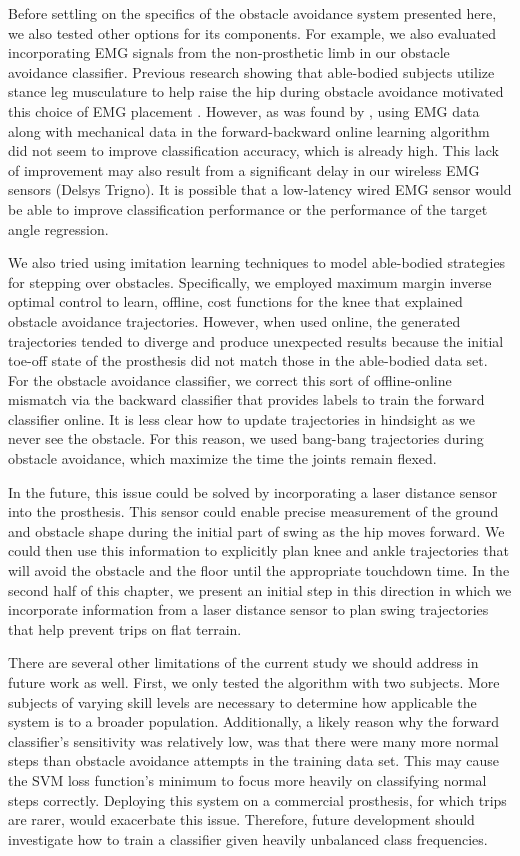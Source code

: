 Before settling on the specifics of the obstacle avoidance system presented
here, we also tested other options for its components. For example, we also
evaluated incorporating EMG signals from the non-prosthetic limb in our obstacle
avoidance classifier. Previous research showing that able-bodied subjects
utilize stance leg musculature to help raise the hip during obstacle avoidance
motivated this choice of EMG placement \citep{patla1995role}. However, as was
found by \citet{spanias2018online}, using EMG data along with mechanical data in
the forward-backward online learning algorithm did not seem to improve
classification accuracy, which is already high. This lack of improvement may
also result from a significant delay in our wireless EMG sensors (Delsys
Trigno). It is possible that a low-latency wired EMG sensor would be able to
improve classification performance or the performance of the target angle
regression.

We also tried using imitation learning techniques to model able-bodied
strategies for stepping over obstacles. Specifically, we employed maximum margin
inverse optimal control \citep{ratliff2007online} to learn, offline, cost
functions for the knee that explained obstacle avoidance trajectories. However,
when used online, the generated trajectories tended to diverge and produce
unexpected results because the initial toe-off state of the prosthesis did not
match those in the able-bodied data set. For the obstacle avoidance classifier,
we correct this sort of offline-online mismatch via the backward classifier
that provides labels to train the forward classifier online. It is less clear
how to update trajectories in hindsight as we never see the obstacle. For this
reason, we used bang-bang trajectories during obstacle avoidance, which maximize
the time the joints remain flexed.

In the future, this issue could be solved by incorporating a laser distance
sensor into the prosthesis. This sensor could enable precise measurement of the
ground and obstacle shape during the initial part of swing as the hip moves
forward. We could then use this information to explicitly plan knee and ankle
trajectories that will avoid the obstacle and the floor until the appropriate
touchdown time. In the second half of this chapter, we present an initial step
in this direction in which we incorporate information from a laser distance
sensor to plan swing trajectories that help prevent trips on flat terrain.

There are several other limitations of the current study we should address in
future work as well. First, we only tested the algorithm with two subjects. More
subjects of varying skill levels are necessary to determine how applicable the
system is to a broader population. Additionally, a likely reason why the forward
classifier's sensitivity was relatively low, was that there were many more
normal steps than obstacle avoidance attempts in the training data set. This may
cause the SVM loss function's minimum to focus more heavily on classifying
normal steps correctly. Deploying this system on a commercial prosthesis, for
which trips are rarer, would exacerbate this issue. Therefore, future
development should investigate how to train a classifier given heavily
unbalanced class frequencies.
